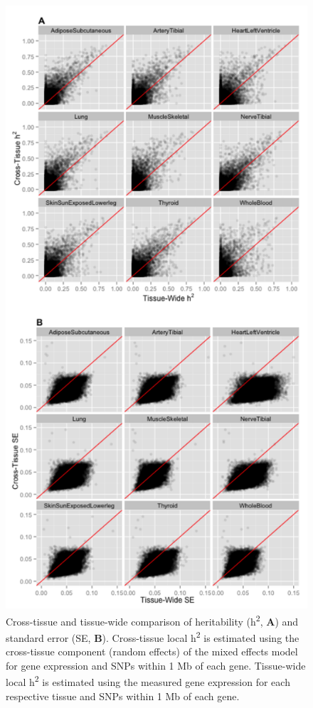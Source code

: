 \documentclass[]{article}
\begin{document}
\begin{figure}[htbp]
\centering
\includegraphics{GenArch_manuscript_files/figure-latex/TWotdH2SE-1.pdf}
\caption{Cross-tissue and tissue-wide comparison of heritability
(h\textsuperscript{2}, \textbf{A}) and standard error (SE, \textbf{B}).
Cross-tissue local h\textsuperscript{2} is estimated using the
cross-tissue component (random effects) of the mixed effects model for
gene expression and SNPs within 1 Mb of each gene. Tissue-wide local
h\textsuperscript{2} is estimated using the measured gene expression for
each respective tissue and SNPs within 1 Mb of each gene.}
\end{figure}
\end{document}
